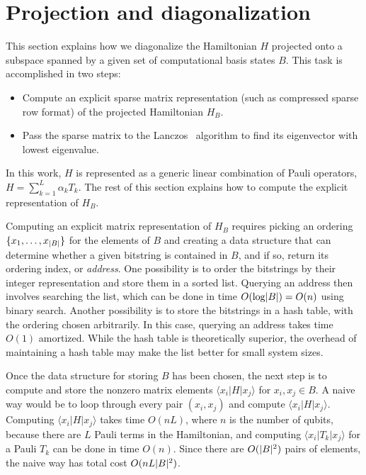 \documentclass[
  reprint,            %
  amsmath,amssymb,
  aps,
  superscriptaddress, %
  longbibliography
]{revtex4-2}
\theoremstyle{definition}
\DeclarePairedDelimiter\set{\{}{\}}
\DeclarePairedDelimiter\abs{\lvert}{\rvert}
\newcommand{\ket}[1]{| #1 \rangle}
\newcommand{\bra}[1]{\langle #1 |}
\begin{document}
\section{Projection and diagonalization}
\label{app:diagonalization}

This section explains how we diagonalize the Hamiltonian $H$ projected onto a subspace spanned by a given set of computational basis states $B$. This task is accomplished in two steps:
\begin{itemize}
    \item Compute an explicit sparse matrix representation (such as compressed sparse row format) of the projected Hamiltonian $H_B$.
    \item Pass the sparse matrix to the Lanczos~\cite{lanczos1950iteration} algorithm to find its eigenvector with lowest eigenvalue.
\end{itemize}
In this work, $H$ is represented as a generic linear combination of Pauli operators, $H = \sum_{k = 1}^L \alpha_k T_k$. The rest of this section explains how to compute the explicit representation of $H_B$.

Computing an explicit matrix representation of $H_B$ requires picking an ordering $\set{x_1, \ldots, x_{\abs{B}}}$ for the elements of $B$ and creating a data structure that can determine whether a given bitstring is contained in $B$, and if so, return its ordering index, or \textit{address}. One possibility is to order the bitstrings by their integer representation and store them in a sorted list. Querying an address then involves searching the list, which can be done in time $O(\log\abs{B}) = O(n)$ using binary search. Another possibility is to store the bitstrings in a hash table, with the ordering chosen arbitrarily. In this case, querying an address takes time $O(1)$ amortized. While the hash table is theoretically superior, the overhead of maintaining a hash table may make the list better for small system sizes.

Once the data structure for storing $B$ has been chosen, the next step is to compute and store the nonzero matrix elements $\bra{x_i} H \ket{x_j}$ for $x_i, x_j \in B$.
A naive way would be to loop through every pair $(x_i, x_j)$ and compute $\bra{x_i} H \ket{x_j}$. Computing $\bra{x_i} H \ket{x_j}$ takes time $O(nL)$, where $n$ is the number of qubits, because there are $L$ Pauli terms in the Hamiltonian, and computing $\bra{x_i} T_k \ket{x_j}$ for a Pauli $T_k$ can be done in time $O(n)$. Since there are $O(\abs{B}^2)$ pairs of elements, the naive way has total cost $O(nL\abs{B}^2)$.
\end{document}
